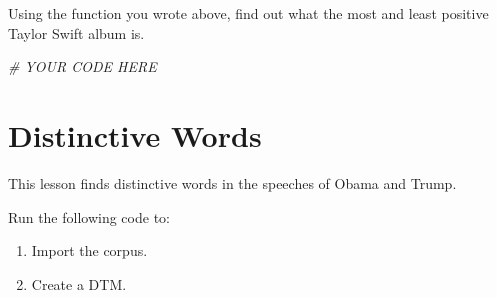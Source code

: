 \documentclass[
]{book}
\newenvironment{Shaded}{\begin{snugshade}}{\end{snugshade}}
\newcommand{\CommentTok}[1]{\textcolor[rgb]{0.56,0.35,0.01}{\textit{#1}}}
\providecommand{\tightlist}{%
  \setlength{\itemsep}{0pt}\setlength{\parskip}{0pt}}
\begin{document}
Using the function you wrote above, find out what the most and least positive Taylor Swift album is.

\begin{Shaded}
\begin{Highlighting}[]
\CommentTok{# YOUR CODE HERE}
\end{Highlighting}
\end{Shaded}

\hypertarget{distinctive-words}{%
\section{Distinctive Words}\label{distinctive-words}}

This lesson finds distinctive words in the speeches of Obama and Trump.

Run the following code to:

\begin{enumerate}
\def\labelenumi{\arabic{enumi}.}
\tightlist
\item
  Import the corpus.
\item
  Create a DTM.
\end{enumerate}
\end{document}
